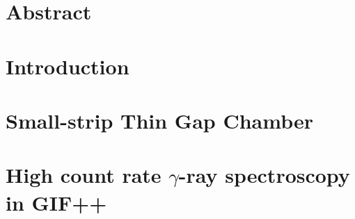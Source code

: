 








\chapter*{Abstract}







\tableofcontents




\chapter{Introduction}



\chapter{Small-strip Thin Gap Chamber}



\chapter{High count rate $\gamma$-ray spectroscopy in GIF++}\label{spectrum}


